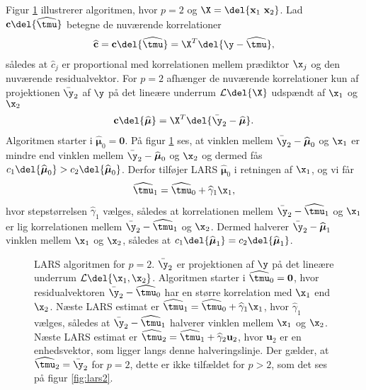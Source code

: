 Figur \ref{fig:lars} illustrerer algoritmen, hvor $p = 2$ og $\X = \del{\textbf{x}_1 \  \textbf{x}_2}$.
Lad \(\mathbf{c} \del{\widehat{\tmu}}\) betegne de nuværende korrelationer
\begin{align}
\widehat{\mathbf{c}} = \mathbf{c} \del{\widehat{\tmu}} = \X^T \del{\y - \widehat{\tmu}}, \label{eq:lars_1.6}
\end{align}
således at \(\widehat{c}_j\) er proportional med korrelationen mellem prædiktor \(\x_j\) og den nuværende residualvektor.
For \(p=2\) afhænger de nuværende korrelationer kun af projektionen \(\bar{\y}_2\) af \(\y\) på det lineære underrum $\mathcal{L} \del{\X}$ udspændt af \(\x_1\) og \(\x_2\)
\begin{align*}
\textbf{c}\del{\boldsymbol{\widehat{\mu}}} =  \X^T \del{ \bar{\y}_2 - \boldsymbol{\widehat{\mu}}}.
\end{align*}
Algoritmen starter i $\widehat{\boldsymbol{\mu}}_0 = \textbf{0}$.
På figur \ref{fig:lars} ses, at vinklen mellem \(\bar{\y}_2 - \widehat{\boldsymbol{\mu}}_0\) og \(\x_1\) er mindre end vinklen mellem \(\bar{\y}_2 - \widehat{\boldsymbol{\mu}}_0\) og \(\x_2\) og dermed fås \(c_1 \del{\widehat{\boldsymbol{\mu}}_0} > c_2 \del{\widehat{\boldsymbol{\mu}}_0}\).
Derfor tilføjer LARS \(\widehat{\boldsymbol{\mu}}_0\) i retningen af \(\x_1\), og vi får
\begin{align*}
\widehat{\tmu}_1 = \widehat{\tmu}_0 + \widehat{\gamma}_1 \x_1,
\end{align*}
hvor stepstørrelsen \(\widehat{\gamma}_1\) vælges, således at korrelationen mellem \(\bar{\y}_2 - \widehat{\tmu}_1\) og \(\x_1\) er lig korrelationen mellem \(\bar{\y}_2 - \widehat{\tmu}_1\) og \(\x_2\).
Dermed halverer \(\bar{\y}_2 - \widehat{\boldsymbol{\mu}}_1\) vinklen mellem \(\x_1\) og \(\x_2\), således at \(c_1 \del{\widehat{\boldsymbol{\mu}}_1} = c_2 \del{\widehat{\boldsymbol{\mu}}_1}\).
%
\begin{figure}[H]
\centering
\scalebox{0.8}{}
\caption{LARS algoritmen for \(p=2\). \(\bar{\y}_2\) er projektionen af \(\y\) på det lineære underrum \(\mathcal{L} \del{\x_1, \x_2}\).
Algoritmen starter i \(\widehat{\tmu}_0=\mathbf{0}\), hvor residualvektoren \(\bar{\y}_2 - \widehat{\tmu}_0\) har en større korrelation med \(\x_1\) end \(\x_2\). Næste LARS estimat er \(\widehat{\tmu}_1 = \widehat{\tmu}_0 + \widehat{\gamma}_1 \x_1\), hvor \(\widehat{\gamma}_1\) vælges, således at \(\bar{\y}_2 - \widehat{\tmu}_1\) halverer vinklen mellem \(\x_1\) og \(\x_2\). Næste LARS estimat er \(\widehat{\tmu}_2 = \widehat{\tmu}_1 + \widehat{\gamma}_2 \mathbf{u}_2\), hvor \(\mathbf{u}_2\) er en enhedsvektor, som ligger langs denne halveringslinje.
Der gælder, at \(\widehat{\tmu}_2 = \bar{\y}_2\) for \(p=2\), dette er ikke tilfældet for \(p>2\), som det ses på figur \ref{fig:lars2}.
 }\label{fig:lars}
\end{figure}
